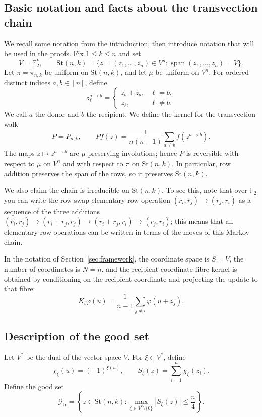 \documentclass[11pt, reqno]{amsart}
\numberwithin{equation}{section}
\newcommand{\Ft}{\mathbb F_2}
\newcommand{\Stief}[2]{\mathrm{St}(#1,#2)}
\newcommand{\Span}{\operatorname{span}}
\newcommand{\Good}{\mathcal G}
\begin{document}
\subsection{Basic notation and facts about the transvection chain}\label{subsec:transvection-chain}
We recall some notation from the introduction, then introduce notation that will be used in the proofs. Fix \(1\le k\le n\) and set
\[
    V=\Ft^k,
    \qquad
    \Stief{n}{k}=\{z=(z_1,\ldots,z_n)\in V^n:\Span(z_1,\ldots,z_n)=V\}.
\]
Let \(\pi=\pi_{n,k}\) be uniform on \(\Stief{n}{k}\), and let \(\mu\) be
uniform on \(V^n\).  For ordered distinct indices \(a,b\in[n]\), define
\[
    z^{a\to b}_\ell=
    \begin{cases}
    z_b+z_a, & \ell=b,\\
    z_\ell, & \ell\ne b.
    \end{cases}
\]
We call \(a\) the donor and \(b\) the recipient. We define the kernel for the transvection walk
\begin{equation}\label{eq:tr-kernel}
    P=P_{n,k},
    \qquad
    Pf(z)=\frac1{n(n-1)}\sum_{a\ne b}f(z^{a\to b}).
\end{equation}
The maps \(z\mapsto z^{a\to b}\) are \(\mu\)-preserving involutions; hence \(P\)
is reversible with respect to \(\mu\) on \(V^n\) and with respect to \(\pi\) on
\(\Stief{n}{k}\). In particular, row addition preserves the span of the rows, so it preserves \(\Stief{n}{k}\). 

We also claim the chain is irreducible on $\Stief{n}{k}$. To see this, note that over $\Ft$ you can write the row-swap elementary row operation $(r_{i}, r_{j}) \to (r_{j}, r_{i})$ as a sequence of the three additions $(r_{i},r_{j}) \to (r_{i} + r_{j}, r_{j}) \to (r_{i} + r_{j}, r_{i}) \to (r_{j},r_{i})$; this means that all elementary row operations can be written in terms of the moves of this Markov chain.


In the notation of Section~\ref{sec:framework}, the
coordinate space is \(S=V\), the number of coordinates is \(N=n\), and the
recipient-coordinate fibre kernel is obtained by conditioning on the recipient coordinate and projecting the update to that fibre:
\begin{equation}\label{eq:tr-fibre-kernel}
    K_i\varphi(u)=\frac1{n-1}\sum_{j\ne i}\varphi(u+z_j).
\end{equation}

\subsection{Description of the good set}\label{subsec:transvection-good-set}
Let \(V^*\) be the dual of the vector space $V$.  For \(\xi\in V^*\), define
\[
    \chi_\xi(u)=(-1)^{\xi(u)},
    \qquad
    S_\xi(z)=\sum_{i=1}^n\chi_\xi(z_i).
\]
Define the good set
\begin{equation}\label{eq:tr-good-set}
    \Good_{\mathrm{tr}}
    =\left\{z\in\Stief{n}{k}:
    \max_{\xi\in V^*\setminus\{0\}}|S_\xi(z)|\le\frac n4\right\}.
\end{equation}
\end{document}
